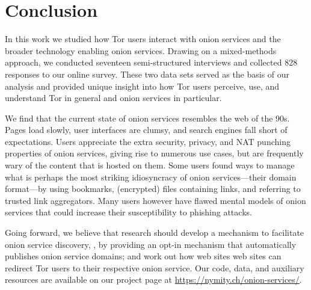 \section{Conclusion}
\label{sec:conclusion}

In this work we studied how Tor users interact with onion services and the
broader technology enabling onion services.  Drawing on a mixed-methods
approach, we conducted seventeen semi-structured interviews and collected 828
responses to our online survey.  These two data sets served as the basis of our
analysis and provided unique insight into how Tor users perceive, use, and
understand Tor in general and onion services in particular.

We find that the current state of onion services resembles the web of the 90s.
Pages load slowly, user interfaces are clumsy, and search engines fall short of
expectations.  Users appreciate the extra security, privacy, and NAT punching
properties of onion services, giving rise to numerous use cases, but are
frequently wary of the content that is hosted on them.  Some users found ways to
manage what is perhaps the most striking idiosyncracy of onion services---their
domain format---by using bookmarks, (encrypted) files containing links, and
referring to trusted link aggregators.  Many users however have flawed mental
models of onion services that could increase their susceptibility to phishing
attacks.

Going forward, we believe that research should \first develop a mechanism to
facilitate onion service discovery, \eg, by providing an opt-in mechanism that 
automatically publishes onion service domains; and \second work out how web
sites web sites can redirect Tor users to their respective onion service.
Our code, data, and auxiliary resources are available on our project page at
\url{https://nymity.ch/onion-services/}.
